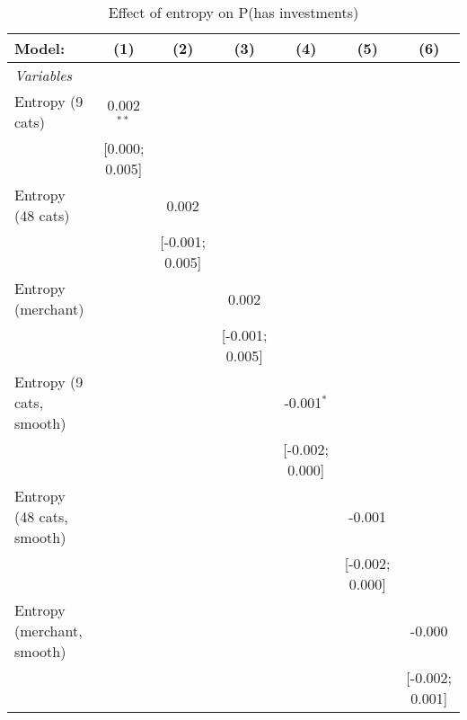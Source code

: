 
\begin{table}[htbp]
   \centering
   \tiny
   \begin{threeparttable}[b]
      \caption{\label{tab:reg_has_investments_cnz} Effect of entropy on P(has investments)}
      \begin{tabular}{lcccccc}
         \tabularnewline \midrule \midrule
         Model:                     & (1)            & (2)             & (3)             & (4)             & (5)             & (6)\\  
         \midrule
         \emph{Variables}\\
         Entropy (9 cats)           & 0.002$^{**}$   &                 &                 &                 &                 &   \\   
                                    & [0.000; 0.005] &                 &                 &                 &                 &   \\   
         Entropy (48 cats)          &                & 0.002           &                 &                 &                 &   \\   
                                    &                & [-0.001; 0.005] &                 &                 &                 &   \\   
         Entropy (merchant)         &                &                 & 0.002           &                 &                 &   \\   
                                    &                &                 & [-0.001; 0.005] &                 &                 &   \\   
         Entropy (9 cats, smooth)   &                &                 &                 & -0.001$^{*}$    &                 &   \\   
                                    &                &                 &                 & [-0.002; 0.000] &                 &   \\   
         Entropy (48 cats, smooth)  &                &                 &                 &                 & -0.001          &   \\   
                                    &                &                 &                 &                 & [-0.002; 0.000] &   \\   
         Entropy (merchant, smooth) &                &                 &                 &                 &                 & -0.000\\   
                                    &                &                 &                 &                 &                 & [-0.002; 0.001]\\   

\end{tabular}
\end{threeparttable}
\end{table}

